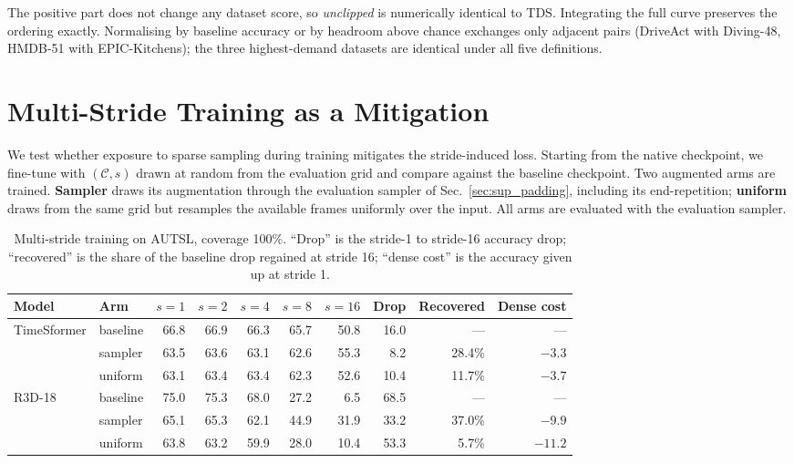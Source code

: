 \documentclass[a4paper, 10pt, conference, onecolumn]{ieeeconf}
\newcommand{\tabtight}{\setlength{\tabcolsep}{3.5pt}\renewcommand{\arraystretch}{1.12}}
\newcommand{\TDS}{\textsc{TDS}}
\begin{document}
The positive part does not change any dataset score, so \emph{unclipped} is
numerically identical to \TDS{}. Integrating the full curve preserves the
ordering exactly. Normalising by baseline accuracy or by headroom above chance
exchanges only adjacent pairs (DriveAct with Diving-48, HMDB-51 with
EPIC-Kitchens); the three highest-demand datasets are identical under all five
definitions.

\section{Multi-Stride Training as a Mitigation}
\label{sec:sup_tra}

We test whether exposure to sparse sampling during training mitigates the
stride-induced loss. Starting from the native checkpoint, we fine-tune with
$(\mathcal{C},s)$ drawn at random from the evaluation grid and compare against
the baseline checkpoint. Two augmented arms are trained. \textbf{Sampler} draws
its augmentation through the evaluation sampler of Sec.~\ref{sec:sup_padding},
including its end-repetition; \textbf{uniform} draws from the same grid but
resamples the available frames uniformly over the input. All arms are evaluated
with the evaluation sampler.

\begin{table}[!htbp]
\centering
\caption{Multi-stride training on AUTSL, coverage 100\%. ``Drop'' is the
stride-1 to stride-16 accuracy drop; ``recovered'' is the share of the baseline
drop regained at stride 16; ``dense cost'' is the accuracy given up at stride 1.}
\label{tab:sup_tra}
\scriptsize\tabtight
\begin{tabular}{l l rrrrr r r r}
\toprule
Model & Arm & $s{=}1$ & $s{=}2$ & $s{=}4$ & $s{=}8$ & $s{=}16$ & Drop & Recovered & Dense cost \\
\midrule
\multirow{3}{*}{TimeSformer}
 & baseline & 66.8 & 66.9 & 66.3 & 65.7 & 50.8 & 16.0 & --- & --- \\
 & sampler  & 63.5 & 63.6 & 63.1 & 62.6 & 55.3 &  8.2 & 28.4\% & $-3.3$ \\
 & uniform  & 63.1 & 63.4 & 63.4 & 62.3 & 52.6 & 10.4 & 11.7\% & $-3.7$ \\
\midrule
\multirow{3}{*}{R3D-18}
 & baseline & 75.0 & 75.3 & 68.0 & 27.2 &  6.5 & 68.5 & --- & --- \\
 & sampler  & 65.1 & 65.3 & 62.1 & 44.9 & 31.9 & 33.2 & 37.0\% & $-9.9$ \\
 & uniform  & 63.8 & 63.2 & 59.9 & 28.0 & 10.4 & 53.3 &  5.7\% & $-11.2$ \\
\bottomrule
\end{tabular}
\end{table}
\end{document}
